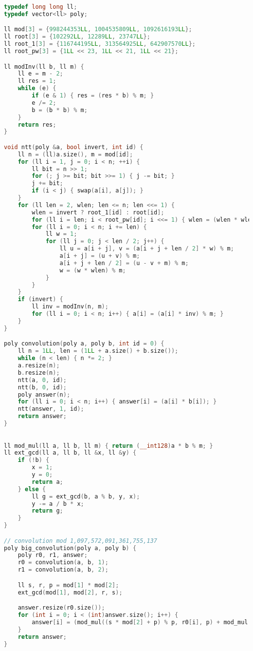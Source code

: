 \documentclass[11pt, a4paper, twoside]{article}
\begin{document}
\begin{lstlisting}[language=C++]
typedef long long ll;
typedef vector<ll> poly;

ll mod[3] = {998244353LL, 1004535809LL, 1092616193LL};
ll root[3] = {102292LL, 12289LL, 23747LL};
ll root_1[3] = {116744195LL, 313564925LL, 642907570LL};
ll root_pw[3] = {1LL << 23, 1LL << 21, 1LL << 21};

ll modInv(ll b, ll m) {
    ll e = m - 2;
    ll res = 1;
    while (e) {
        if (e & 1) { res = (res * b) % m; }
        e /= 2;
        b = (b * b) % m;
    }
    return res;
}

void ntt(poly &a, bool invert, int id) {
    ll n = (ll)a.size(), m = mod[id];
    for (ll i = 1, j = 0; i < n; ++i) {
        ll bit = n >> 1;
        for (; j >= bit; bit >>= 1) { j -= bit; }
        j += bit;
        if (i < j) { swap(a[i], a[j]); }
    }
    for (ll len = 2, wlen; len <= n; len <<= 1) {
        wlen = invert ? root_1[id] : root[id];
        for (ll i = len; i < root_pw[id]; i <<= 1) { wlen = (wlen * wlen) % m; }
        for (ll i = 0; i < n; i += len) {
            ll w = 1;
            for (ll j = 0; j < len / 2; j++) {
                ll u = a[i + j], v = (a[i + j + len / 2] * w) % m;
                a[i + j] = (u + v) % m;
                a[i + j + len / 2] = (u - v + m) % m;
                w = (w * wlen) % m;
            }
        }
    }
    if (invert) {
        ll inv = modInv(n, m);
        for (ll i = 0; i < n; i++) { a[i] = (a[i] * inv) % m; }
    }
}

poly convolution(poly a, poly b, int id = 0) {
    ll n = 1LL, len = (1LL + a.size() + b.size());
    while (n < len) { n *= 2; }
    a.resize(n);
    b.resize(n);
    ntt(a, 0, id);
    ntt(b, 0, id);
    poly answer(n);
    for (ll i = 0; i < n; i++) { answer[i] = (a[i] * b[i]); }
    ntt(answer, 1, id);
    return answer;
}
\end{lstlisting}

\begin{lstlisting}[language=C++]

ll mod_mul(ll a, ll b, ll m) { return (__int128)a * b % m; }
ll ext_gcd(ll a, ll b, ll &x, ll &y) {
    if (!b) {
        x = 1;
        y = 0;
        return a;
    } else {
        ll g = ext_gcd(b, a % b, y, x);
        y -= a / b * x;
        return g;
    }
}

// convolution mod 1,097,572,091,361,755,137
poly big_convolution(poly a, poly b) {
    poly r0, r1, answer;
    r0 = convolution(a, b, 1);
    r1 = convolution(a, b, 2);

    ll s, r, p = mod[1] * mod[2];
    ext_gcd(mod[1], mod[2], r, s);

    answer.resize(r0.size());
    for (int i = 0; i < (int)answer.size(); i++) {
        answer[i] = (mod_mul((s * mod[2] + p) % p, r0[i], p) + mod_mul((r * mod[1] + p) % p, r1[i], p) + p) % p;
    }
    return answer;
}
\end{lstlisting}
\end{document}
